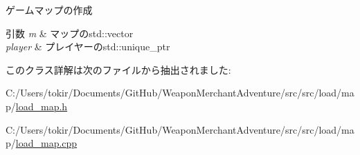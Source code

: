 ゲームマップの作成 


\begin{DoxyParams}{引数}
{\em m} & マップのstd\+::vector \\
\hline
{\em player} & プレイヤーのstd\+::unique\+\_\+ptr \\
\hline
\end{DoxyParams}


このクラス詳解は次のファイルから抽出されました\+:\begin{DoxyCompactItemize}
\item 
C\+:/\+Users/tokir/\+Documents/\+Git\+Hub/\+Weapon\+Merchant\+Adventure/src/src/load/map/\mbox{\hyperlink{load__map_8h}{load\+\_\+map.\+h}}\item 
C\+:/\+Users/tokir/\+Documents/\+Git\+Hub/\+Weapon\+Merchant\+Adventure/src/src/load/map/\mbox{\hyperlink{load__map_8cpp}{load\+\_\+map.\+cpp}}\end{DoxyCompactItemize}
